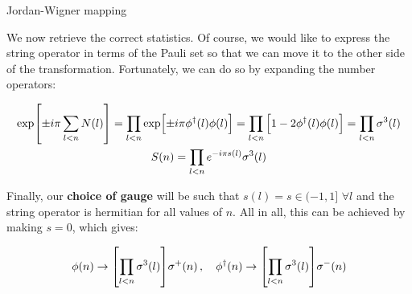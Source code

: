 \begin{frame}[allowframebreaks]{Jordan-Wigner mapping}
\break

	We now retrieve the correct statistics. Of course, we would like to express the string operator in terms of the Pauli set so that we can move it to the other side of the transformation. Fortunately, we can do so by expanding the number operators:

	\begin{gather*}
	  \exp[\pm i\pi \sum_{l<n} N(l)] =
		  \prod_{l<n}\exp[\pm i\pi \phi^{\dagger}(l)\phi(l)] =
		  \prod_{l<n}\qty[1-2\phi^{\dagger}(l)\phi(l)] =
		  \prod_{l<n}\sigma^3(l) \\
		S(n) = \prod_{l<n} e^{-i\pi s(l)} \sigma^3(l)
	\end{gather*}

	Finally, our \textbf{choice of gauge} will be such that $s(l) = s \in (-1,1]$ $\forall l$ and the string operator is hermitian for all values of $n$. All in all, this can be achieved by making $s=0$, which gives:

	\begin{gather*}
		\phi(n) \rightarrow \qty[\prod_{l<n} \sigma^3(l)]\sigma^{+}(n) \,,\quad
		\phi^{\dagger}(n) \rightarrow \qty[\prod_{l<n} \sigma^3(l)]\sigma^{-}(n)
	\end{gather*}



\end{frame}

